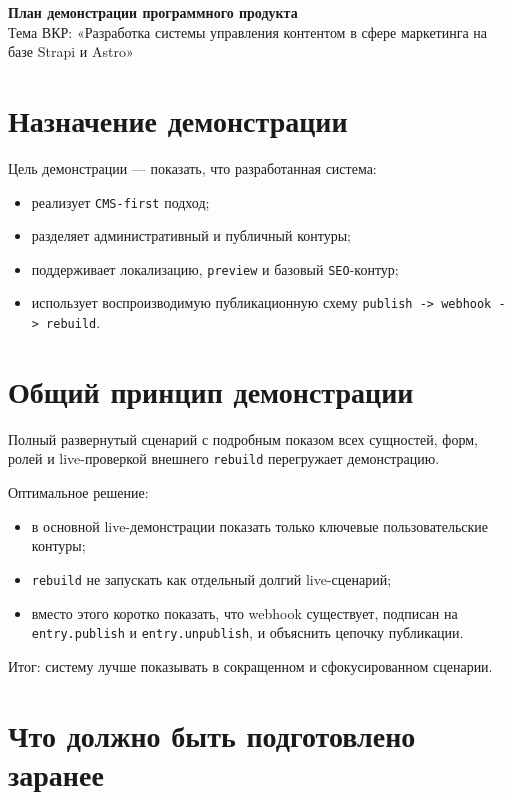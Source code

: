 \documentclass[12pt,a4paper]{article}
\begin{document}
\begin{center}
{\Large \textbf{План демонстрации программного продукта}}\\[0.8em]
{\normalsize Тема ВКР: «Разработка системы управления контентом в сфере маркетинга на базе Strapi и Astro»}
\end{center}

\section*{Назначение демонстрации}

Цель демонстрации --- показать, что разработанная система:
\begin{itemize}
  \item реализует \texttt{CMS-first} подход;
  \item разделяет административный и публичный контуры;
  \item поддерживает локализацию, \texttt{preview} и базовый \texttt{SEO}-контур;
  \item использует воспроизводимую публикационную схему
  \texttt{publish -> webhook -> rebuild}.
\end{itemize}

\section*{Общий принцип демонстрации}

Полный развернутый сценарий с подробным показом всех сущностей, форм, ролей и live-проверкой
внешнего \texttt{rebuild} перегружает демонстрацию.

Оптимальное решение:
\begin{itemize}
  \item в основной live-демонстрации показать только ключевые пользовательские контуры;
  \item \texttt{rebuild} не запускать как отдельный долгий live-сценарий;
  \item вместо этого коротко показать, что webhook существует, подписан на
  \texttt{entry.publish} и \texttt{entry.unpublish}, и объяснить цепочку публикации.
\end{itemize}

Итог: систему лучше показывать в сокращенном и сфокусированном сценарии.

\section*{Что должно быть подготовлено заранее}
\end{document}
